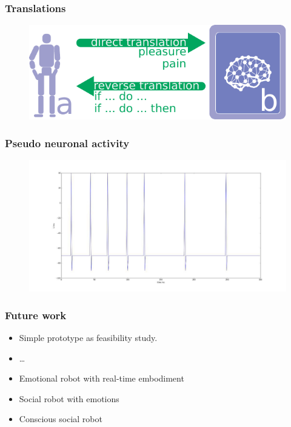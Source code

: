 \documentclass[12pt, aspectratio=169]{beamer}
\begin{document}

\begin{frame}
  \frametitle{Translations}

  \begin{figure}
    \includegraphics[width=0.8\linewidth]{reverse_translation}
  \end{figure}
  
\end{frame}


\begin{frame}
\frametitle{Pseudo neuronal activity}
\begin{figure}
\includegraphics[width=1.0\textwidth]{pseudo-neuronal-activity}
\end{figure}
\end{frame}


\begin{frame}
\frametitle{Future work}
\begin{itemize}
  \item Simple prototype as feasibility study.
  \item \ldots\
  \item Emotional robot with real-time embodiment
  \item Social robot with emotions
  \item Conscious social robot
\end{itemize}
\end{frame}
\end{document}
